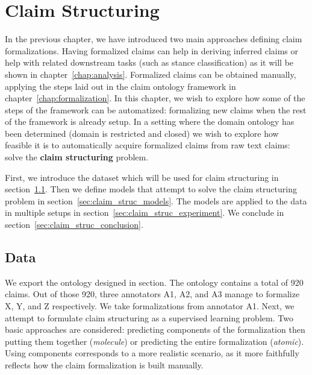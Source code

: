 \chapter{Claim Structuring}
\label{chap:claim_structuring}

In the previous chapter, we have introduced two main approaches defining claim
formalizations.  Having formalized claims can help in deriving inferred claims
or help with related downstream tasks (such as stance classification) as it
will be shown in chapter~\ref{chap:analysis}.
Formalized claims can be obtained manually, applying the steps laid out in the 
claim ontology framework in chapter~\ref{chap:formalization}. 
In this chapter, we wish to explore how some of the steps of the framework can 
be automatized: formalizing new claims when the rest of the framework is already setup.
In a setting where the domain ontology has been determined (domain is
restricted and closed) we wish to explore how feasible it is to automatically
acquire formalized claims from raw text claims: solve the \textbf{claim structuring}
problem.

First, we introduce the dataset which will be used for claim structuring
in section~\ref{sec:claim_struc_data}. Then we define models that attempt to solve the 
claim structuring problem in section~\ref{sec:claim_struc_models}. 
The models are applied to the data in multiple setups in section~\ref{sec:claim_struc_experiment}.
We conclude in section~\ref{sec:claim_struc_conclusion}. 

\section{Data}
\label{sec:claim_struc_data}

We export the ontology designed in 
section. 
The ontology contains a total of 920 claims. Out of those 920, three annotators 
A1, A2, and A3 manage to formalize X, Y, and Z respectively.
We take formalizations from annotator A1. 
Next, we attempt to formulate claim structuring as a supervised learning problem. 
Two basic approaches are considered: predicting components of the formalization then putting
them together (\emph{molecule}) or predicting the entire formalization (\emph{atomic}). 
Using components corresponds to a more realistic scenario, as it more
faithfully reflects how the claim formalization is built manually. 

